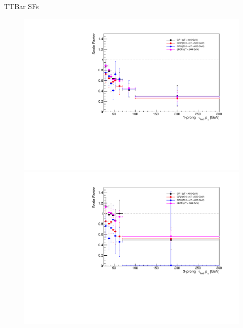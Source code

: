 \documentclass[aspectratio=46, dvipdfmx, 10pt, t]{beamer} %
\begin{document}
\begin{frame}{TTBar SFs}
  \vspace{15mm}
  \begin{figure}
    \setcounter{subfigure}{0}
    \centering
        \includegraphics[scale=0.29]{scale_factor_all_1P_notrigger}
        \includegraphics[scale=0.29]{scale_factor_all_3P_notrigger}
  \end{figure}
\end{frame}

\label{backup}
\end{document}

